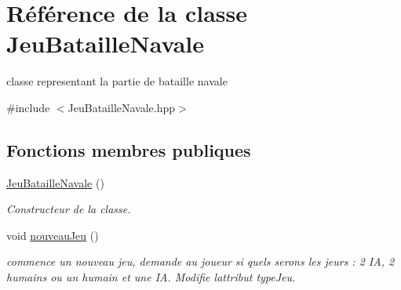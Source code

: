 \hypertarget{class_jeu_bataille_navale}{}\section{Référence de la classe Jeu\+Bataille\+Navale}
\label{class_jeu_bataille_navale}


classe representant la partie de bataille navale  




{\ttfamily \#include $<$Jeu\+Bataille\+Navale.\+hpp$>$}

\subsection*{Fonctions membres publiques}
\begin{DoxyCompactItemize}
\item 
\mbox{\label{class_jeu_bataille_navale_aae41366decd137f03ac95aff8b8e0f49}} 
\mbox{\hyperlink{class_jeu_bataille_navale_aae41366decd137f03ac95aff8b8e0f49}{Jeu\+Bataille\+Navale}} ()
\begin{DoxyCompactList}\small\item\em Constructeur de la classe. \end{DoxyCompactList}\item 
\mbox{\label{class_jeu_bataille_navale_a3f59d8ee46918984df4a13cd261d5491}} 
void \mbox{\hyperlink{class_jeu_bataille_navale_a3f59d8ee46918984df4a13cd261d5491}{nouveau\+Jeu}} ()
\begin{DoxyCompactList}\small\item\em commence un nouveau jeu, demande au joueur si quels serons les jeurs \+: 2 IA, 2 humains ou un humain et une IA. Modifie l\textquotesingle{}attribut type\+Jeu. \end{DoxyCompactList}\end{DoxyCompactItemize}
